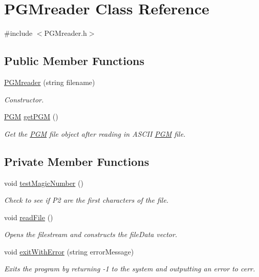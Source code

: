 \hypertarget{class_p_g_mreader}{}\section{P\+G\+Mreader Class Reference}
\label{class_p_g_mreader}


{\ttfamily \#include $<$P\+G\+Mreader.\+h$>$}

\subsection*{Public Member Functions}
\begin{DoxyCompactItemize}
\item 
\hyperlink{class_p_g_mreader_a8169831b7c71a4ac6857d926637ee373}{P\+G\+Mreader} (string filename)
\begin{DoxyCompactList}\small\item\em Constructor. \end{DoxyCompactList}\item 
\hyperlink{class_p_g_m}{P\+G\+M} \hyperlink{class_p_g_mreader_a7a9d1eddef8516e1b50715295498ec41}{get\+P\+G\+M} ()
\begin{DoxyCompactList}\small\item\em Get the \hyperlink{class_p_g_m}{P\+G\+M} file object after reading in A\+S\+C\+I\+I \hyperlink{class_p_g_m}{P\+G\+M} file. \end{DoxyCompactList}\end{DoxyCompactItemize}
\subsection*{Private Member Functions}
\begin{DoxyCompactItemize}
\item 
void \hyperlink{class_p_g_mreader_a9fed4fd38b10e7b39153c4994b3ecc8a}{test\+Magic\+Number} ()
\begin{DoxyCompactList}\small\item\em Check to see if \textquotesingle{}P2\textquotesingle{} are the first characters of the file. \end{DoxyCompactList}\item 
void \hyperlink{class_p_g_mreader_adc7887bcdafb2350a5b15e2c0108d273}{read\+File} ()
\begin{DoxyCompactList}\small\item\em Opens the filestream and constructs the file\+Data vector. \end{DoxyCompactList}\item 
void \hyperlink{class_p_g_mreader_a055a02fb4d6b4bfcdfc2dba57db734ec}{exit\+With\+Error} (string error\+Message)
\begin{DoxyCompactList}\small\item\em Exits the program by returning -\/1 to the system and outputting an error to cerr. \end{DoxyCompactList}\end{DoxyCompactItemize}
